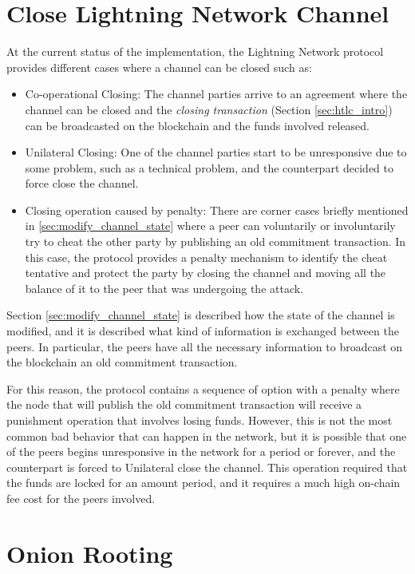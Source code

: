 \section{Close Lightning Network Channel}
\label{sec:close_operation}

At the current status of the implementation, the Lightning Network protocol provides different cases where a channel can be closed such as:

\begin{itemize}
  \item Co-operational Closing: The channel parties arrive to an agreement where the channel can be closed and the
        \emph{closing transaction} (Section \ref{sec:htlc_intro}) can be broadcasted on the blockchain and the funds involved released.
  \item Unilateral Closing: One of the channel parties start to be unresponsive due to some problem, such as a technical problem, and the counterpart
        decided to force close the channel.
  \item Closing operation caused by penalty: There are corner cases briefly mentioned in \ref{sec:modify_channel_state} where a peer can voluntarily or involuntarily try to cheat the other party by publishing an old commitment transaction. In this case, the protocol provides a penalty mechanism to identify the cheat tentative and protect the party by closing the channel and moving all the balance of it to the peer that was undergoing the attack.
\end{itemize}

Section \ref{sec:modify_channel_state} is described how the state of the channel is modified, and it is described what kind of information is
exchanged between the peers. In particular, the peers have all the necessary information to broadcast on the blockchain an old commitment transaction.

For this reason, the protocol contains a sequence of option with a penalty where the node that will publish the old commitment transaction
will receive a punishment operation that involves losing funds. However, this is not the most common bad behavior that can happen in
the network, but it is possible that one of the peers begins unresponsive in the network for a period or forever, and the counterpart is forced to Unilateral close the channel. This operation
required that the funds are locked for an amount period, and it requires a much high on-chain fee cost for the peers involved.

\section{Onion Rooting}
\label{sec:onion_routing}

